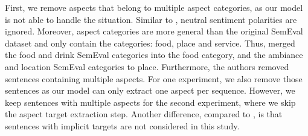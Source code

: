 \documentclass[american, oneside]{ecsgdp}
\begin{document}
\begin{table}[htbp]
\centering
\caption{Descriptive statistics of the SemEval 2015 and SemEval 2016 datasets.}
\label{tab:data}
\end{table}

First, we remove aspects that belong to multiple aspect categories, as our model is not able to handle the situation. Similar to \textcite{Huang2020JASen, Kumar2021CASC}, neutral sentiment polarities are ignored. Moreover, aspect categories are more general than the original SemEval dataset and only contain the categories: food, place and service. Thus, \textcite{Kumar2021CASC} merged the food and drink SemEval categories into the food category, and the ambiance and location SemEval categories to place. Furthermore, the authors removed sentences containing multiple aspects. For one experiment, we also remove those sentences as our model can only extract one aspect per sequence. However, we keep sentences with multiple aspects for the second experiment, where we skip the aspect target extraction step. Another difference, compared to \textcite{Kumar2021CASC}, is that sentences with implicit targets are not considered in this study.
\end{document}
